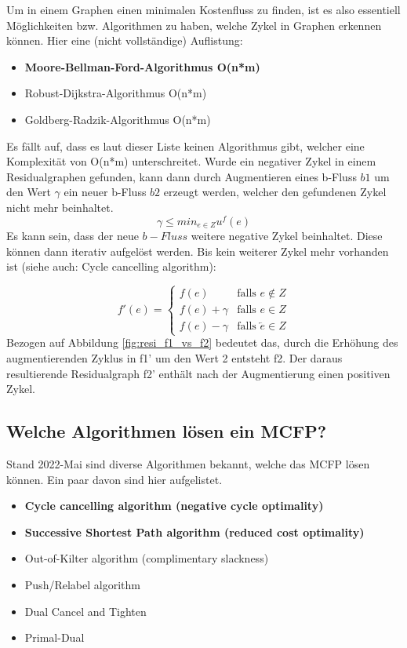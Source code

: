 Um in einem Graphen einen minimalen Kostenfluss zu finden, ist es also essentiell Möglichkeiten bzw. Algorithmen zu haben, welche Zykel in Graphen erkennen können. Hier eine (nicht vollständige) Auflistung:

\begin{itemize}
\item \textbf{Moore-Bellman-Ford-Algorithmus O(n*m)}
\item Robust-Dijkstra-Algorithmus O(n*m)
\item Goldberg-Radzik-Algorithmus O(n*m)
\end{itemize}

Es fällt auf, dass es laut dieser Liste keinen Algorithmus gibt, welcher eine Komplexität von O(n*m) unterschreitet. Wurde ein negativer Zykel in einem Residualgraphen gefunden, kann dann durch Augmentieren eines b-Fluss $b1$ um den Wert $\gamma$  ein neuer b-Fluss $b2$ erzeugt werden, welcher den gefundenen Zykel nicht mehr beinhaltet.
\begin{equation}
    \gamma \leq min_{e\in Z} u^f(e)
\label{def:gamma}
\end{equation}
Es kann sein, dass der neue $b-Fluss$ weitere negative Zykel beinhaltet. Diese können dann iterativ aufgelöst werden. Bis kein weiterer Zykel mehr vorhanden ist (siehe auch: Cycle cancelling algorithm):

\[ f'(e) = \begin{cases}
 f(e) & \text{falls } e \notin Z \\
 f(e) + \gamma & \text{falls    } e \in Z\\
 f(e) - \gamma & \text{falls    } \overleftarrow{e} \in Z
\end{cases} \]
Bezogen auf Abbildung \ref{fig:resi_f1_vs_f2} bedeutet das, durch die Erhöhung des augmentierenden Zyklus in f1' um den Wert 2 entsteht f2. Der daraus resultierende Residualgraph f2' enthält nach der Augmentierung einen positiven Zykel.

\subsection{Welche Algorithmen lösen ein MCFP?}

Stand 2022-Mai sind diverse Algorithmen bekannt, welche das MCFP lösen können. Ein paar davon sind hier aufgelistet. 

\begin{itemize}
 \item \textbf{Cycle cancelling algorithm (negative cycle optimality)}
 \item \textbf{Successive Shortest Path algorithm (reduced cost optimality)}
 \item Out-of-Kilter algorithm (complimentary slackness)
 \item Push/Relabel algorithm
 \item Dual Cancel and Tighten
 \item Primal-Dual
\end{itemize}

